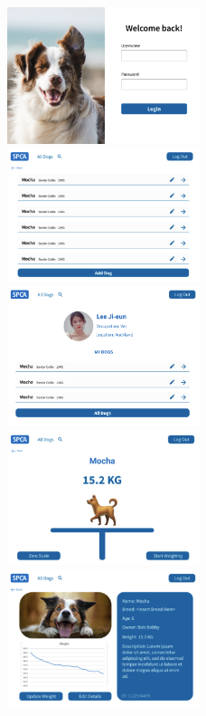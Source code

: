 \begin{figure}
    \centering
    \includegraphics[width=0.5\textwidth]{images/web/web1.png}\hfill
    \includegraphics[width=0.5\textwidth]{images/web/web2.png} \\[\smallskipamount]
    \includegraphics[width=0.5\textwidth]{images/web/web3.png}\hfill
    \includegraphics[width=0.5\textwidth]{images/web/web4.png} \\[\smallskipamount]
    \includegraphics[width=0.5\textwidth]{images/web/web5.png}\hfill

\end{figure}
